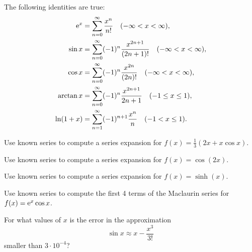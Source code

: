 \begin{theorem}
The following identities are true:
\begin{align}
\mathrm{e}^x &= \sum_{n=0}^\infty \frac{x^n}{n!}\quad (-\infty < x <\infty),\\
\sin x &=\sum_{n=0}^\infty (-1)^n\frac{x^{2n+1}}{(2n+1)!}\quad (-\infty < x < \infty),\\
\cos x &=\sum_{n=0}^\infty (-1)^n\frac{x^{2n}}{(2n)!}\quad (-\infty < x <\infty),\\
\arctan x &=\sum_{n=0}^\infty (-1)^n\frac{x^{2n+1}}{2n+1}\quad (-1\le x\le 1),\\
\ln(1+ x) &= \sum_{n=1}^\infty (-1)^{n+1}\frac{x^n}{n}\quad (-1< x\le 1).
\end{align}
\end{theorem}

\newpage 

\begin{example}
Use known series to compute a series expansion for $f(x) = \frac{1}{3}(2x + x\cos x)$.
\end{example}

\newpage 

\begin{example}
Use known series to compute a series expansion for $f(x) = \cos(2x)$.
\end{example}

\newpage 

\begin{example}
Use known series to compute a series expansion for $f(x) = \sinh(x)$.
\end{example}

\newpage 

\begin{example}
Use known series to compute the first 4 terms of the Maclaurin series for $f(x) = \mathrm{e}^x\cos x$.
\end{example}

\newpage

\begin{example}
For what values of $x$ is the error in the approximation
\begin{equation*}
\sin x \approx x - \frac{x^3}{3!}
\end{equation*}
smaller than $3\cdot 10^{-4}$?
\end{example}

